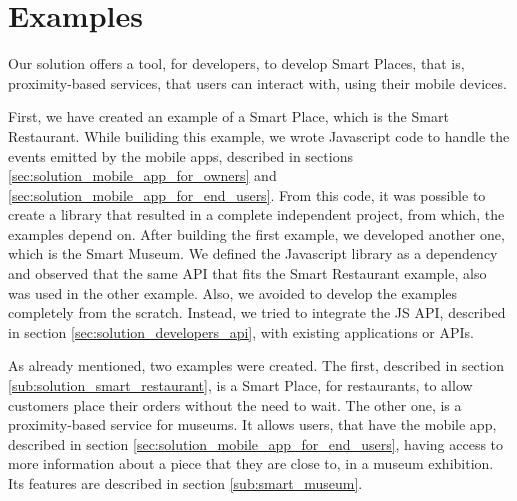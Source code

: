 \section{Examples}
\label{sec:solution_examples}
Our solution offers a tool, for developers, to develop Smart Places, that is, proximity-based services, that users can interact with, using their mobile devices.

First, we have created an example of a Smart Place, which is the Smart Restaurant.
While builiding this example, we wrote Javascript code to handle the events emitted by the mobile apps, described in sections \ref{sec:solution_mobile_app_for_owners} and \ref{sec:solution_mobile_app_for_end_users}.
From this code, it was possible to create a library that resulted in a complete independent project, from which, the examples depend on.
After building the first example, we developed another one, which is the Smart Museum.
We defined the Javascript library as a dependency and observed that the same \gls{API} that fits the Smart Restaurant example, also was used in the other example.
Also, we avoided to develop the examples completely from the scratch.
Instead, we tried to integrate the \gls{JS} \gls{API}, described in section \ref{sec:solution_developers_api}, with existing applications or \glspl{API}.

As already mentioned, two examples were created.
The first, described in section \ref{sub:solution_smart_restaurant}, is a Smart Place, for restaurants, to allow customers place their orders without the need to wait.
The other one, is a proximity-based service for museums.
It allows users, that have the mobile app, described in section \ref{sec:solution_mobile_app_for_end_users}, having access to more information about a piece that they are close to, in a museum exhibition.
Its features are described in section \ref{sub:smart_museum}.

